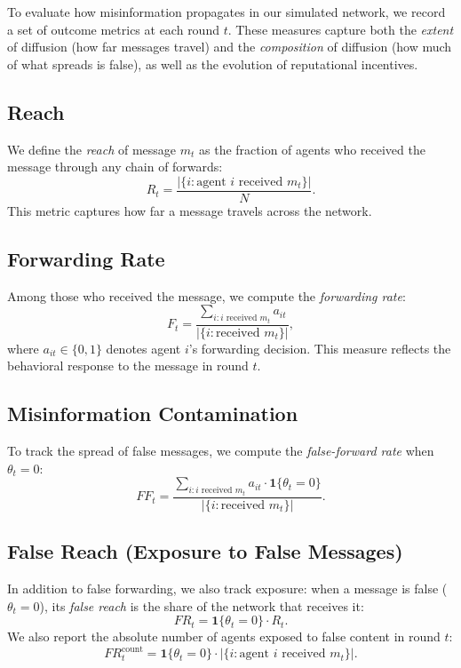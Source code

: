 
To evaluate how misinformation propagates in our simulated network, we record a set of outcome metrics at each round $t$. These measures capture both the \emph{extent} of diffusion (how far messages travel) and the \emph{composition} of diffusion (how much of what spreads is false), as well as the evolution of reputational incentives.

\subsection{Reach}

We define the \textit{reach} of message $m_t$ as the fraction of agents who received the message through any chain of forwards:
\[
R_t = \frac{|\{ i : \text{agent } i \text{ received } m_t \}|}{N}.
\]
This metric captures how far a message travels across the network.

\subsection{Forwarding Rate}

Among those who received the message, we compute the \textit{forwarding rate}:
\[
F_t = \frac{\sum_{i: i \text{ received } m_t} a_{it}}{|\{ i : \text{received } m_t \}|},
\]
where $a_{it} \in \{0,1\}$ denotes agent $i$'s forwarding decision.  
This measure reflects the behavioral response to the message in round $t$.

\subsection{Misinformation Contamination}

To track the spread of false messages, we compute the \textit{false-forward rate} when $\theta_t = 0$:
\[
FF_t = \frac{\sum_{i: i \text{ received } m_t} a_{it} \cdot \mathbf{1}\{\theta_t = 0\}}
{|\{ i : \text{received } m_t \}|}.
\]

\subsection{False Reach (Exposure to False Messages)}

In addition to false forwarding, we also track exposure: when a message is false ($\theta_t=0$), its \textit{false reach} is the share of the network that receives it:
\[
FR_t = \mathbf{1}\{\theta_t = 0\}\cdot R_t.
\]
We also report the absolute number of agents exposed to false content in round $t$:
\[
FR^{\text{count}}_t = \mathbf{1}\{\theta_t = 0\}\cdot |\{ i : \text{agent } i \text{ received } m_t \}|.
\]

